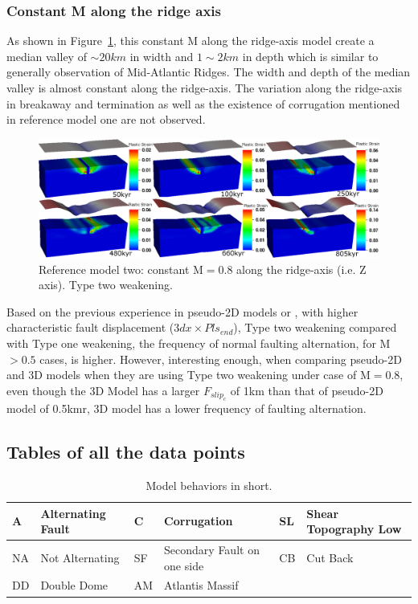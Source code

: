 \subsubsection{Constant M along the ridge axis }

As shown in Figure~\ref{fig_Results1_3}, this constant M along the ridge-axis model create a median valley of $\sim 20km$ in width and $1\sim2km$ in depth which is similar to generally observation of Mid-Atlantic Ridges. The width and depth of the median valley is almost constant along the ridge-axis. The variation along the ridge-axis in breakaway and termination as well as the existence of corrugation mentioned in reference model one are not observed. 
\begin{figure}[H]
  \centering
    \includegraphics[width=1.0\textwidth]{fig_Results1_3.eps}
  \caption{Reference model two: constant M$=0.8$ along the ridge-axis (i.e. Z axis). Type two weakening.}
 \label{fig_Results1_3}
\end{figure}   

Based on the previous experience in pseudo-2D models or \citep{Lavier2000}, with higher characteristic fault displacement ($3dx \times Pls_{end}$), Type two weakening compared with Type one weakening, the frequency of normal faulting alternation, for M$>0.5$ cases, is higher. However, interesting enough, when comparing pseudo-2D and 3D models when they are using Type two weakening under case of M$=0.8$, even though the 3D Model has a larger $F_{slip_{c}}$ of 1km than that of pseudo-2D model of 0.5kmr, 3D model has a lower frequency of faulting alternation. 

\subsection{Tables of all the data points}


\begin{table}[H]
\begin{small}
\begin{center}
\begin{tabular}{||l|l||l|l||l|l||}
\hline
A & Alternating Fault & C & Corrugation & SL & Shear Topography Low \\
\hline
NA& Not Alternating & SF & Secondary Fault on one side & CB & Cut Back   \\
\hline
DD &  Double Dome  & AM    & Atlantis Massif &  &   \\
\hline
\end{tabular}
\end{center}
\end{small}
\caption{Model behaviors in short.}
\end{table}


